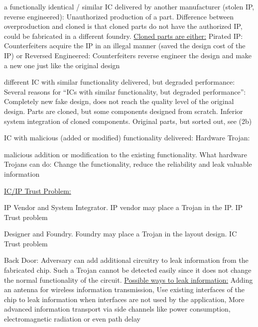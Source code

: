 \documentclass[landscape, a4paper]{article}
\begin{document}
\begin{minipage}[t]{0.2\linewidth}
\begin{betterlist}
\begin{enumerate}
\begin{enumerate}[label=\color{PrimaryColor}\bfseries\alph*.]
			\end{enumerate}
			\item \alert{a functionally identical / similar IC delivered by another manufacturer (stolen IP, reverse engineered):} Unauthorized production of a part. \alert{Difference} between \alert{overproduction} and \alert{cloned} is that cloned parts do not have the authorized IP, could be fabricated in a different foundry. \underline{Cloned parts are either:} \alert{Pirated IP:} Counterfeiters acquire the IP in an illegal manner (saved the design cost of the IP) or \alert{Reversed Engineered:} Counterfeiters reverse engineer the design and make a new one just like the original design
			\item \alert{different IC with similar functionality delivered, but degraded performance:} Several reasons for \enquote{ICs with similar functionality, but degraded performance}: Completely new fake design, does not reach the quality level of the original design. Parts are cloned, but some components designed from scratch. Inferior system integration of cloned components. Original parts, but sorted out, see (2b)
			\item \alert{IC with malicious (added or modified) functionality delivered:} \alert{Hardware Trojan:}
\end{betterlist}
\end{enumerate}
\end{betterlist}
\end{minipage}
\end{document}
